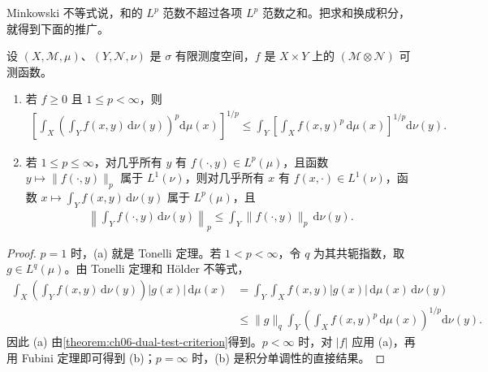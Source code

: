 \documentclass[../../main.tex]{subfiles}
\begin{document}
Minkowski 不等式说，和的 $L^p$ 范数不超过各项 $L^p$ 范数之和。把求和换成积分，就得到下面的推广。
\begin{theorem}\label{theorem:ch06-integral-minkowski}
设 $(X,\mathscr M,\mu)$、$(Y,\mathscr N,\nu)$ 是 $\sigma$ 有限测度空间，$f$ 是 $X\times Y$ 上的 $(\mathscr M\otimes\mathscr N)$ 可测函数。
\begin{enumerate}
\item\label{item:ch06-integral-minkowski-positive} 若 $f\geqslant0$ 且 $1\leqslant p<\infty$，则
\begin{align*}
\left[\int_X\left(\int_Y f(x,y)\,\mathrm d\nu(y)\right)^p\mathrm d\mu(x)\right]^{1/p}
\leqslant\int_Y\left[\int_X f(x,y)^p\,\mathrm d\mu(x)\right]^{1/p}\mathrm d\nu(y).
\end{align*}
\item\label{item:ch06-integral-minkowski-complex} 若 $1\leqslant p\leqslant\infty$，对几乎所有 $y$ 有 $f(\cdot,y)\in L^p(\mu)$，且函数 $y\mapsto\|f(\cdot,y)\|_p$ 属于 $L^1(\nu)$，则对几乎所有 $x$ 有 $f(x,\cdot)\in L^1(\nu)$，函数 $x\mapsto\int_Yf(x,y)\,\mathrm d\nu(y)$ 属于 $L^p(\mu)$，且
\begin{align*}
\left\|\int_Yf(\cdot,y)\,\mathrm d\nu(y)\right\|_p
\leqslant\int_Y\|f(\cdot,y)\|_p\,\mathrm d\nu(y).
\end{align*}
\end{enumerate}
\end{theorem}
\begin{proof}
$p=1$ 时，(a) 就是 Tonelli 定理。若 $1<p<\infty$，令 $q$ 为其共轭指数，取 $g\in L^q(\mu)$。由 Tonelli 定理和 Hölder 不等式，
\begin{align*}
\int_X\left(\int_Yf(x,y)\,\mathrm d\nu(y)\right)|g(x)|\,\mathrm d\mu(x)
&=\int_Y\int_X f(x,y)|g(x)|\,\mathrm d\mu(x)\,\mathrm d\nu(y)\\
&\leqslant\|g\|_q\int_Y\left(\int_X f(x,y)^p\,\mathrm d\mu(x)\right)^{1/p}\mathrm d\nu(y).
\end{align*}
因此 (a) 由\cref{theorem:ch06-dual-test-criterion}得到。$p<\infty$ 时，对 $|f|$ 应用 (a)，再用 Fubini 定理即可得到 (b)；$p=\infty$ 时，(b) 是积分单调性的直接结果。
\end{proof}
\end{document}
